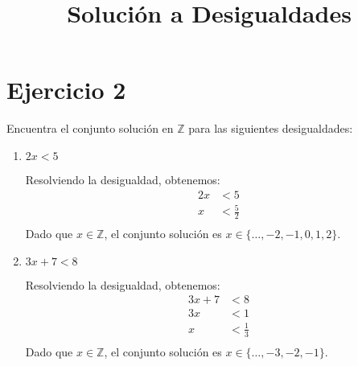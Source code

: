 \documentclass{article}
\begin{document}
\title{Solución a Desigualdades}
\maketitle

\section*{Ejercicio 2}

Encuentra el conjunto solución en \( \mathbb{Z} \) para las siguientes desigualdades:

\begin{enumerate}
    \item \( 2x < 5 \)
    
    Resolviendo la desigualdad, obtenemos:
    \begin{align*}
        2x &< 5 \\
        x &< \frac{5}{2} \\
    \end{align*}
    Dado que \( x \in \mathbb{Z} \), el conjunto solución es \( x \in \{ \dots, -2, -1, 0, 1,2 \} \).
    
    \item \( 3x + 7 < 8 \)
    
    Resolviendo la desigualdad, obtenemos:
    \begin{align*}
        3x + 7 &< 8 \\
        3x &< 1 \\
        x &< \frac{1}{3} \\
    \end{align*}
    Dado que \( x \in \mathbb{Z} \), el conjunto solución es \( x \in \{ \dots, -3, -2, -1 \} \).
\end{enumerate}
\end{document}

